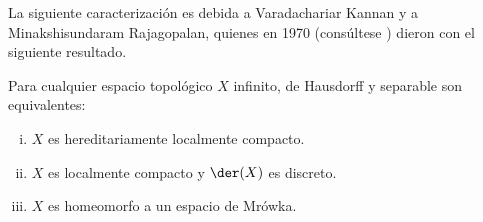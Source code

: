 	La siguiente caracterización es debida a Varadachariar Kannan y a Minakshisundaram Rajagopalan, quienes en 1970 (consúltese \cite{kannanHereditarily}) dieron con el siguiente resultado.
	
	\begin{teorema}\label{teo-HLCCaract}
		Para cualquier espacio topológico $X$ infinito, de Hausdorff y separable son equivalentes:
		\begin{enumerate}[i)]
			\item $X$ es hereditariamente localmente compacto.
			\item $X$ es localmente compacto y $\der(X)$ es discreto.
			\item $X$ es homeomorfo a un espacio de Mrówka.
		\end{enumerate}
	\end{teorema}
	
